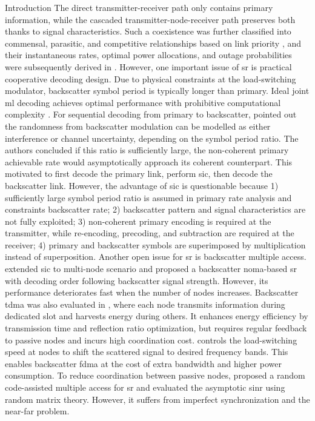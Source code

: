 \documentclass[journal]{IEEEtran}
\begin{document}
\begin{section}{Introduction}
	The direct transmitter-receiver path only contains primary information, while the cascaded transmitter-node-receiver path preserves both thanks to signal characteristics.
	Such a coexistence was further classified into commensal, parasitic, and competitive relationships based on link priority \cite{Guo2019b}, and their instantaneous rates, optimal power allocations, and outage probabilities were subsequently derived in \cite{Guo2019b,Ding2020}.
	However, one important issue of \gls{sr} is practical cooperative decoding design.
	Due to physical constraints at the load-switching modulator, backscatter symbol period is typically longer than primary.
	Ideal joint \gls{ml} decoding achieves optimal performance with prohibitive computational complexity \cite{Yang2018,Liang2020,Zhang2022}.
	For sequential decoding from primary to backscatter, \cite{Long2020a} pointed out the randomness from backscatter modulation can be modelled as either interference or channel uncertainty, depending on the symbol period ratio.
	The authors concluded if this ratio is sufficiently large, the non-coherent primary achievable rate would asymptotically approach its coherent counterpart.
	This motivated \cite{Long2020a,Liang2020,Guo2019b,Ding2020,Zhou2019a,Wu2021a,Xu2021a,Yang2021a,Yang2018,Han2021,Zhang2022} to first decode the primary link, perform \gls{sic}, then decode the backscatter link.
	However, the advantage of \gls{sic} is questionable because 1) sufficiently large symbol period ratio is assumed in primary rate analysis and constraints backscatter rate; 2) backscatter pattern and signal characteristics are not fully exploited; 3) non-coherent primary encoding is required at the transmitter, while re-encoding, precoding, and subtraction are required at the receiver; 4) primary and backscatter symbols are superimposed by multiplication instead of superposition.
	Another open issue for \gls{sr} is backscatter multiple access.
	\cite{Xu2021a} extended \gls{sic} to multi-node scenario and proposed a backscatter \gls{noma}-based \gls{sr} with decoding order following backscatter signal strength.
	However, its performance deteriorates fast when the number of nodes increases.
	Backscatter \gls{tdma} was also evaluated in \cite{Yang2021a}, where each node transmits information during dedicated slot and harvests energy during others.
	It enhances energy efficiency by transmission time and reflection ratio optimization, but requires regular feedback to passive nodes and incurs high coordination cost.
	\cite{Vougioukas2019} controls the load-switching speed at nodes to shift the scattered signal to desired frequency bands.
	This enables backscatter \gls{fdma} at the cost of extra bandwidth and higher power consumption.
	To reduce coordination between passive nodes, \cite{Han2021} proposed a random code-assisted multiple access for \gls{sr} and evaluated the asymptotic \gls{sinr} using random matrix theory.
	However, it suffers from imperfect synchronization and the near-far problem.


\end{section}
\end{document}
